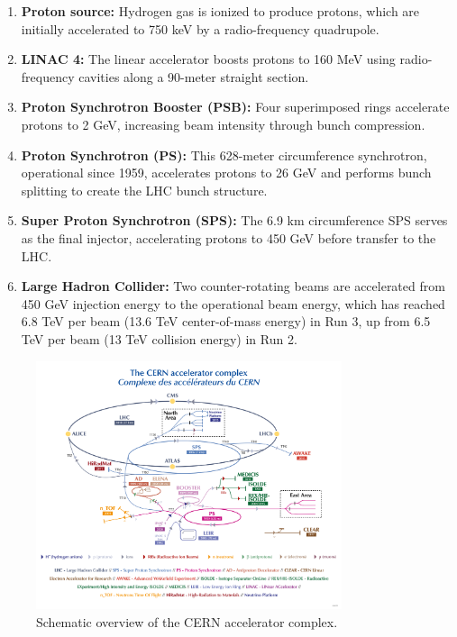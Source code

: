 \begin{enumerate}
\item \textbf{Proton source:} Hydrogen gas is ionized to produce protons, which are initially accelerated to 750 keV by a radio-frequency quadrupole.

\item \textbf{LINAC 4:} The linear accelerator boosts protons to 160 MeV using radio-frequency cavities along a 90-meter straight section.

\item \textbf{Proton Synchrotron Booster (PSB):} Four superimposed rings accelerate protons to 2 GeV, increasing beam intensity through bunch compression.

\item \textbf{Proton Synchrotron (PS):} This 628-meter circumference synchrotron, operational since 1959, accelerates protons to 26 GeV and performs bunch splitting to create the LHC bunch structure.

\item \textbf{Super Proton Synchrotron (SPS):} The 6.9 km circumference SPS serves as the final injector, accelerating protons to 450 GeV before transfer to the LHC.

\item \textbf{Large Hadron Collider:} Two counter-rotating beams are accelerated from 450 GeV injection energy to the operational beam energy, which has reached 6.8 TeV per beam (13.6 TeV center-of-mass energy) in Run 3, up from 6.5 TeV per beam (13 TeV collision energy) in Run 2.
\end{enumerate}

\begin{figure}[!htb]
\begin{center}
\includegraphics[width=0.8\textwidth]{figures/CCC-v2022.png}\caption{Schematic overview of the CERN accelerator complex.}
\label{fig:cernaccelerators}
\end{center}
\end{figure}

